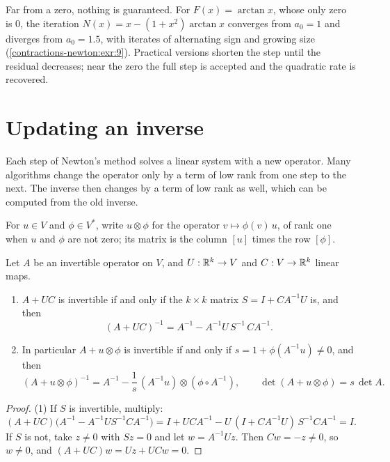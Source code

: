 \begin{notechapter}
\begin{pitfall}
Far from a zero, nothing is guaranteed. For $F(x) = \arctan x$, whose only
zero is $0$, the iteration $N(x) = x - (1 + x^2)\arctan x$ converges from
$a_0 = 1$ and diverges from $a_0 = 1.5$, with iterates of alternating sign
and growing size (\cref{contractions-newton:exr:9}). Practical versions
shorten the step until the residual decreases; near the zero the full
step is accepted and the quadratic rate is recovered.
\end{pitfall}

\section{Updating an inverse}\label{contractions-newton:sec:woodbury}

Each step of Newton's method solves a linear system with a new
operator. Many algorithms change the operator only by a term of low
rank from one step to the next. The inverse then changes by a term of
low rank as well, which can be computed from the old inverse.

For $u\in V$ and $\phi\in V^*$, write $u\otimes\phi$ for the operator
$v\mapsto\phi(v)\,u$, of rank one when $u$ and $\phi$ are not zero; its
matrix is the column $[u]$ times the row $[\phi]$.

\begin{proposition}\label{contractions-newton:prop:woodbury}
Let $A$ be an invertible operator on $V$, and $U:\mathbb{R}^k\to V$ and
$C:V\to\mathbb{R}^k$ linear maps.
\begin{enumerate}[nosep]
  \item $A + UC$ is invertible if and only if the $k\times k$ matrix
        $S = I + CA^{-1}U$ is, and then
        \[
          (A + UC)^{-1} = A^{-1} - A^{-1}U\,S^{-1}\,CA^{-1} .
        \]
  \item In particular $A + u\otimes\phi$ is invertible if and only if
        $s = 1 + \phi(A^{-1}u)\neq0$, and then
        \[
          (A + u\otimes\phi)^{-1}
          = A^{-1} - \frac1s\,(A^{-1}u)\otimes(\phi\circ A^{-1}) ,
          \qquad
          \det(A + u\otimes\phi) = s\,\det A .
        \]
\end{enumerate}
\end{proposition}

\begin{proof}
(1) If $S$ is invertible, multiply:
\[
  (A + UC)\bigl(A^{-1} - A^{-1}US^{-1}CA^{-1}\bigr)
  = I + UCA^{-1} - U\,(I + CA^{-1}U)\,S^{-1}CA^{-1} = I .
\]
If $S$ is not, take $z\neq0$ with $Sz = 0$ and let $w = A^{-1}Uz$. Then
$Cw = -z\neq0$, so $w\neq0$, and $(A + UC)w = Uz + UCw = 0$.


\end{proof}
\end{notechapter}
